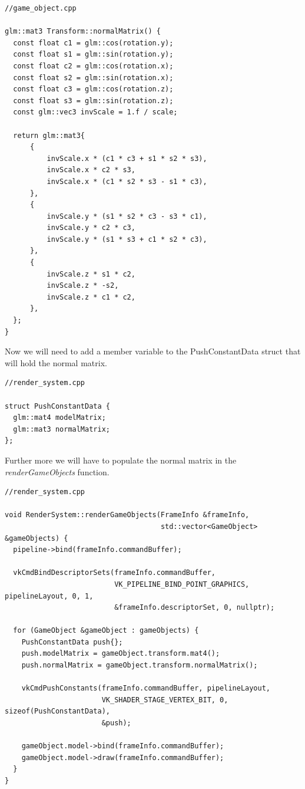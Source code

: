 \documentclass[12pt]{report} \usepackage{preamble}
\begin{document}
\begin{lstlisting}[Language=C++]
//game_object.cpp

glm::mat3 Transform::normalMatrix() {
  const float c1 = glm::cos(rotation.y);
  const float s1 = glm::sin(rotation.y);
  const float c2 = glm::cos(rotation.x);
  const float s2 = glm::sin(rotation.x);
  const float c3 = glm::cos(rotation.z);
  const float s3 = glm::sin(rotation.z);
  const glm::vec3 invScale = 1.f / scale;

  return glm::mat3{
      {
          invScale.x * (c1 * c3 + s1 * s2 * s3),
          invScale.x * c2 * s3,
          invScale.x * (c1 * s2 * s3 - s1 * c3),
      },
      {
          invScale.y * (s1 * s2 * c3 - s3 * c1),
          invScale.y * c2 * c3,
          invScale.y * (s1 * s3 + c1 * s2 * c3),
      },
      {
          invScale.z * s1 * c2,
          invScale.z * -s2,
          invScale.z * c1 * c2,
      },
  };
}

\end{lstlisting}

Now we will need to add a member variable to the PushConstantData struct that will hold the normal matrix.

\begin{lstlisting}[Language=C++]
//render_system.cpp

struct PushConstantData {
  glm::mat4 modelMatrix;
  glm::mat3 normalMatrix;
};
\end{lstlisting}

Further more we will have to populate the normal matrix in the \textit{renderGameObjects} function.

\begin{lstlisting}[Language=C++]
//render_system.cpp

void RenderSystem::renderGameObjects(FrameInfo &frameInfo,
                                     std::vector<GameObject> &gameObjects) {
  pipeline->bind(frameInfo.commandBuffer);

  vkCmdBindDescriptorSets(frameInfo.commandBuffer,
                          VK_PIPELINE_BIND_POINT_GRAPHICS, pipelineLayout, 0, 1,
                          &frameInfo.descriptorSet, 0, nullptr);

  for (GameObject &gameObject : gameObjects) {
    PushConstantData push{};
    push.modelMatrix = gameObject.transform.mat4();
    push.normalMatrix = gameObject.transform.normalMatrix();

    vkCmdPushConstants(frameInfo.commandBuffer, pipelineLayout,
                       VK_SHADER_STAGE_VERTEX_BIT, 0, sizeof(PushConstantData),
                       &push);

    gameObject.model->bind(frameInfo.commandBuffer);
    gameObject.model->draw(frameInfo.commandBuffer);
  }
}
\end{lstlisting}
\end{document}
